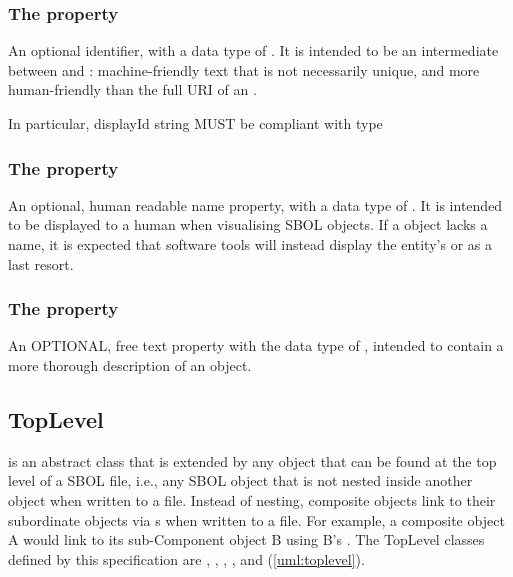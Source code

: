 \subsubsection*{The  property}
\label{sec:displayId}
An optional identifier, with a data type of . It is intended to be an intermediate between  and : machine-friendly text that is not necessarily unique, and more human-friendly than the full URI of an .

In particular, displayId string MUST be compliant with type 

\subsubsection*{The  property}
\label{sec:name}
An optional, human readable name property, with a data type of . It is intended to be displayed to a human when visualising SBOL objects.  
If a  object lacks a name, it is expected that software tools will instead display the entity's  or  as a last resort.




\subsubsection*{The  property}
\label{sec:description}
An OPTIONAL, free text property with the data type of , intended to contain a more thorough description of an object.


\subsection {TopLevel}
\label{sec:TopLevel}
 is an abstract class that is extended by any  object that can be found at the top level of a SBOL file, i.e., any SBOL object that is not nested inside another object when written to a file. Instead of nesting, composite  objects link to their subordinate  objects via s when written to a file. For example, a composite  object A would link to its sub-Component object B using B's . The TopLevel classes defined by this specification are , , , ,  and  (\ref{uml:toplevel}).

